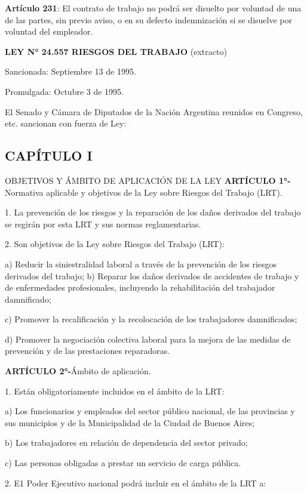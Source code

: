\textbf{Artículo 231}: El contrato de trabajo no podrá ser disuelto por voluntad de una de las partes, sin previo aviso, o en su defecto indemnización si se disuelve por voluntad del empleador.

\textbf{LEY N° 24.557 RIESGOS DEL TRABAJO }(extracto)

Sancionada: Septiembre 13 de 1995.

Promulgada: Octubre 3 de 1995.

El Senado y Cámara de Diputados de la Nación Argentina reunidos en Congreso, etc. sancionan con fuerza de Ley:

\subsection*{CAPÍTULO I}
OBJETIVOS Y ÁMBITO DE APLICACIÓN DE LA LEY \textbf{ARTÍCULO 1°-}Normativa aplicable y objetivos de la Ley sobre Riesgos del Trabajo (LRT).

1. La prevención de los riesgos y la reparación de los daños derivados del trabajo se regirán por esta LRT y sus normas reglamentarias.

2. Son objetivos de la Ley sobre Riesgos del Trabajo (LRT):

a) Reducir la siniestralidad laboral a través de la prevención de los riesgos derivados del trabajo; b) Reparar los daños derivados de accidentes de trabajo y de enfermedades profesionales, incluyendo la rehabilitación del trabajador damnificado;

c) Promover la recalificación y la recolocación de los trabajadores damnificados;



d) Promover la negociación colectiva laboral para la mejora de las medidas de prevención y de las prestaciones reparadoras.

\textbf{ARTÍCULO 2°-}Ámbito de aplicación.

1. Están obligatoriamente incluidos en el ámbito de la LRT:

a) Los funcionarios y empleados del sector público nacional, de las provincias y sus municipios y de la Municipalidad de la Ciudad de Buenos Aires;

b) Los trabajadores en relación de dependencia del sector privado;

c) Las personas obligadas a prestar un servicio de carga pública.

2. E1 Poder Ejecutivo nacional podrá incluir en el ámbito de la LRT a:

